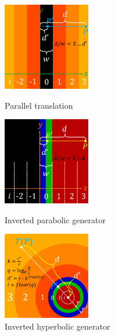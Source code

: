 \begin{figure}[h!tbp]
 \begin{minipage}[t]{0.24\hsize}
  \begin{center}
   \includegraphics[width=1.5in, height=1.5in, keepaspectratio]{./img/application/optimization/translationMod.pdf}
  \end{center}
  \caption{Parallel translation}
  \label{fig:translationMod}
 \end{minipage}
 \hspace*{\fill}
 \begin{minipage}[t]{0.24\hsize}
  \begin{center}
   \includegraphics[width=1.5in, height=1.5in, keepaspectratio]{./img/application/optimization/parabolicMod.pdf}
  \end{center}
  \caption{Inverted parabolic generator}
  \label{fig:parabolicMod}
 \end{minipage}
 \hspace*{\fill}
 \begin{minipage}[t]{0.24\hsize}
   \begin{center}
    \includegraphics[width=1.5in, height=1.5in, keepaspectratio]{./img/application/optimization/hyperbolicMod.pdf}
   \end{center}
   \caption{Inverted hyperbolic generator}
   \label{fig:loxodromicMod}

\end{minipage}
\end{figure}
